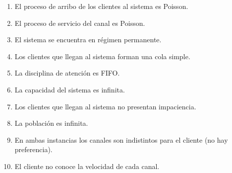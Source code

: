 \documentclass[a4paper,11pt]{article}
\begin{document}
\leftskip=36pt
\parindent=-18pt
\begin{enumerate}[1.]
  \item El proceso de arribo de los clientes al sistema es Poisson.
  \item El proceso de servicio del canal es Poisson.
  \item El sistema se encuentra en régimen permanente. 
  \item Los clientes que llegan al sistema forman una cola simple. 
  \item La disciplina de atención es FIFO. 
  \item La capacidad del sistema es infinita. 
  \item Los clientes que llegan al sistema no presentan impaciencia.
  \item La población es infinita.
  \item En ambas instancias los canales son indistintos para el cliente (no hay
    preferencia). 
  \item El cliente no conoce la velocidad de cada canal.
\end{enumerate}
\end{document}
